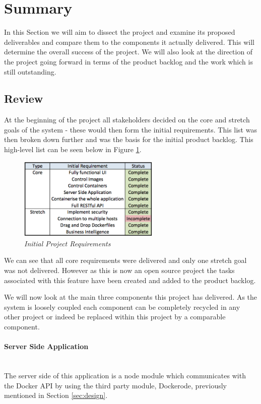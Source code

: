 \section{Summary}
\label{sec:summary}
In this Section we will aim to dissect the project and examine its proposed deliverables and compare them to the components it actually delivered. This will determine the overall success of the project. We will also look at the direction of the project going forward in terms of the product backlog and the work which is still outstanding.

\subsection{Review}
At the beginning of the project all stakeholders decided on the core and stretch goals of the system - these would then form the initial requirements. This list was then broken down further and was the basis for the initial product backlog. This high-level list can be seen below in Figure \ref{fig:requirements}.

\begin{figure}[!ht]
\centering
\includegraphics*[width=0.6\textwidth]{images/requirements}
\caption{\em Initial Project Requirements}
\label{fig:requirements}
\end{figure}

We can see that all core requirements were delivered and only one stretch goal was not delivered. However as this is now an open source project the tasks associated with this feature have been created and added to the product backlog.

We will now look at the main three components this project has delivered. As the system is loosely coupled each component can be completely recycled in any other project or indeed be replaced within this project by a comparable component.

\paragraph{Server Side Application}\mbox{}\\
The server side of this application is a node module which communicates with the Docker API by using the third party module, Dockerode, previously mentioned in Section \ref{sec:design}.

